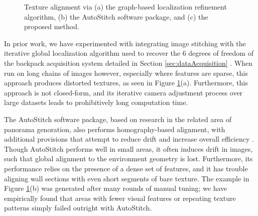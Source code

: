 \documentclass[]{spie}  %
\begin{document}
\begin{figure}
  \centering {}

  \centering {}

  \centering {}

  \caption{Texture alignment via (a) the graph-based localization
    refinement algorithm, (b) the AutoStitch software package, and (c)
    the proposed method.}
  \label{fig:mosaic3D}
\end{figure}


In prior work, we have experimented with integrating image stitching
with the iterative global localization algorithm used to recover the 6
degrees of freedom of the backpack acquisition system detailed in
Section \ref{sec:dataAcquisition} \cite{liu2010indoor}. When run on
long chains of images however, especially where features are sparse,
this approach produces distorted textures, as seen in Figure
\ref{fig:mosaic3D}(a). Furthermore, this approach is not closed-form,
and its iterative camera adjustment process over large datasets leads
to prohibitively long computation time.

The AutoStitch software package, based on research in the related area
of panorama genoration, also performs homography-based alignment, with
additional provisions that attempt to reduce drift and increase
overall efficiency \cite{panorama2d, autostitch}. Though AutoStitch
performs well in small areas, it often induces drift in images,
such that global alignment to the environment geometry is
lost. Furthermore, its performance relies on the presence of a dense
set of features, and it has trouble aligning wall sections with even
short segments of bare texture. The example in Figure
\ref{fig:mosaic3D}(b) was generated after many rounds of manual
tuning; we have empirically found that areas with fewer visual
features or repeating texture patterns simply failed outright with
AutoStitch.
\end{document}
